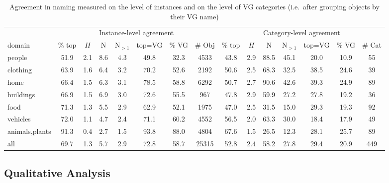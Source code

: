 \begin{table*}
\small
\begin{tabular}{p{1.3cm}ccccccc|ccccccc}
\toprule
 & \multicolumn{7}{c|}{Instance-level agreement} & \multicolumn{7}{c}{Category-level agreement}\\ 
           domain & \% top &    $H$ &    N & N$_{>1}$ & top=VG &  \% VG &      \# Obj & \% top &    $H$ &     N & N$_{>1}$ & top=VG &  \% VG &  \# Cat\\
\midrule
         people &  51.9 &  2.1 &  8.6 &   4.3 &   49.8 &  32.3 &   4533 &  43.8 &  2.9 &  88.5 &  45.1 &   20.0 &  10.9 &   55 \\
         clothing &  63.9 &  1.6 &  6.4 &   3.2 &   70.2 &  52.6 &   2192 &  50.6 &  2.5 &  68.3 &  32.5 &   38.5 &  24.6 &   39 \\
           home &  66.4 &  1.5 &  6.3 &   3.1 &   78.5 &  58.8 &   6292 &  50.7 &  2.7 &  90.6 &  42.6 &   39.3 &  24.9 &   89 \\
      buildings &  66.9 &  1.5 &  6.9 &   3.0 &   72.6 &  55.5 &    967 &  47.8 &  2.9 &  59.9 &  27.2 &   27.8 &  19.2 &   36 \\       
                  food &  71.3 &  1.3 &  5.5 &   2.9 &   62.9 &  52.1 &   1975 &  47.0 &  2.5 &  31.5 &  15.0 &   29.3 &  19.3 &   92 \\
              vehicles &  72.0 &  1.1 &  4.7 &   2.4 &   71.1 &  60.2 &   4552 &  56.5 &  2.0 &  63.3 &  30.0 &   18.4 &  17.9 &   49 \\
        animals,plants &  91.3 &  0.4 &  2.7 &   1.5 &   93.8 &  88.0 &   4804 &  67.6 &  1.5 &  26.5 &  12.3 &   28.1 &  25.7 &   89 \\
       \midrule
       all &  69.7 &  1.3 &  5.7 &   2.9 &   72.8 &  58.7 &  25315 &  52.8 &  2.4 &  58.2 &  27.8 &   29.4 &  20.9 &  449 \\

\bottomrule
\end{tabular}\caption{Agreement in naming measured on the level of instances and on the level of VG categories (i.e.\ after grouping objects by their VG name) }
\label{tab:agree}
\end{table*}


\subsection{Qualitative Analysis}

